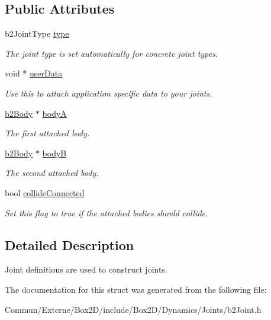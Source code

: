 \subsection*{Public Attributes}
\begin{DoxyCompactItemize}
\item 
b2\+Joint\+Type \hyperlink{structb2_joint_def_a470f2879b24adb05facbd49f338856fb}{type}\hypertarget{structb2_joint_def_a470f2879b24adb05facbd49f338856fb}{}\label{structb2_joint_def_a470f2879b24adb05facbd49f338856fb}

\begin{DoxyCompactList}\small\item\em The joint type is set automatically for concrete joint types. \end{DoxyCompactList}\item 
void $\ast$ \hyperlink{structb2_joint_def_a07eb150daaaa52fc09c3bcf402b295fe}{user\+Data}\hypertarget{structb2_joint_def_a07eb150daaaa52fc09c3bcf402b295fe}{}\label{structb2_joint_def_a07eb150daaaa52fc09c3bcf402b295fe}

\begin{DoxyCompactList}\small\item\em Use this to attach application specific data to your joints. \end{DoxyCompactList}\item 
\hyperlink{classb2_body}{b2\+Body} $\ast$ \hyperlink{structb2_joint_def_a8cd54c93da396be75a9788f2c6897f05}{bodyA}\hypertarget{structb2_joint_def_a8cd54c93da396be75a9788f2c6897f05}{}\label{structb2_joint_def_a8cd54c93da396be75a9788f2c6897f05}

\begin{DoxyCompactList}\small\item\em The first attached body. \end{DoxyCompactList}\item 
\hyperlink{classb2_body}{b2\+Body} $\ast$ \hyperlink{structb2_joint_def_aa4f4dee2fbcd12187b19506b60e68e3d}{bodyB}\hypertarget{structb2_joint_def_aa4f4dee2fbcd12187b19506b60e68e3d}{}\label{structb2_joint_def_aa4f4dee2fbcd12187b19506b60e68e3d}

\begin{DoxyCompactList}\small\item\em The second attached body. \end{DoxyCompactList}\item 
bool \hyperlink{structb2_joint_def_aef099a1f89b64e230173b6016848ea9b}{collide\+Connected}\hypertarget{structb2_joint_def_aef099a1f89b64e230173b6016848ea9b}{}\label{structb2_joint_def_aef099a1f89b64e230173b6016848ea9b}

\begin{DoxyCompactList}\small\item\em Set this flag to true if the attached bodies should collide. \end{DoxyCompactList}\end{DoxyCompactItemize}


\subsection{Detailed Description}
Joint definitions are used to construct joints. 

The documentation for this struct was generated from the following file\+:\begin{DoxyCompactItemize}
\item 
Commun/\+Externe/\+Box2\+D/include/\+Box2\+D/\+Dynamics/\+Joints/b2\+Joint.\+h\end{DoxyCompactItemize}

